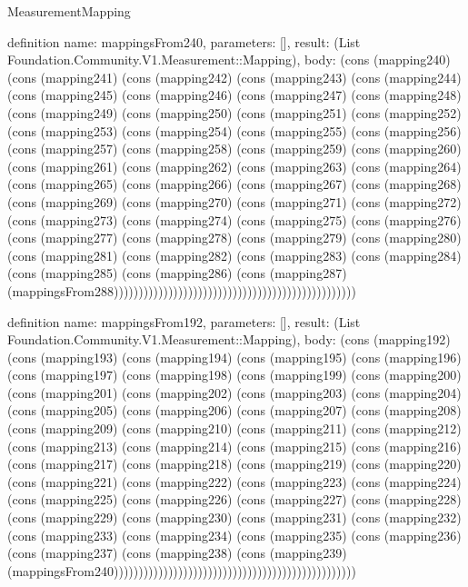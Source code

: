 \begin{lexlean}{MeasurementMapping}
\begin{semanticmodule}
definition{
  name: mappingsFrom240,
  parameters: [],
  result: (List Foundation.Community.V1.Measurement::Mapping),
  body: (cons (mapping240) (cons (mapping241) (cons (mapping242) (cons (mapping243) (cons (mapping244) (cons (mapping245) (cons (mapping246) (cons (mapping247) (cons (mapping248) (cons (mapping249) (cons (mapping250) (cons (mapping251) (cons (mapping252) (cons (mapping253) (cons (mapping254) (cons (mapping255) (cons (mapping256) (cons (mapping257) (cons (mapping258) (cons (mapping259) (cons (mapping260) (cons (mapping261) (cons (mapping262) (cons (mapping263) (cons (mapping264) (cons (mapping265) (cons (mapping266) (cons (mapping267) (cons (mapping268) (cons (mapping269) (cons (mapping270) (cons (mapping271) (cons (mapping272) (cons (mapping273) (cons (mapping274) (cons (mapping275) (cons (mapping276) (cons (mapping277) (cons (mapping278) (cons (mapping279) (cons (mapping280) (cons (mapping281) (cons (mapping282) (cons (mapping283) (cons (mapping284) (cons (mapping285) (cons (mapping286) (cons (mapping287) (mappingsFrom288)))))))))))))))))))))))))))))))))))))))))))))))))
}

definition{
  name: mappingsFrom192,
  parameters: [],
  result: (List Foundation.Community.V1.Measurement::Mapping),
  body: (cons (mapping192) (cons (mapping193) (cons (mapping194) (cons (mapping195) (cons (mapping196) (cons (mapping197) (cons (mapping198) (cons (mapping199) (cons (mapping200) (cons (mapping201) (cons (mapping202) (cons (mapping203) (cons (mapping204) (cons (mapping205) (cons (mapping206) (cons (mapping207) (cons (mapping208) (cons (mapping209) (cons (mapping210) (cons (mapping211) (cons (mapping212) (cons (mapping213) (cons (mapping214) (cons (mapping215) (cons (mapping216) (cons (mapping217) (cons (mapping218) (cons (mapping219) (cons (mapping220) (cons (mapping221) (cons (mapping222) (cons (mapping223) (cons (mapping224) (cons (mapping225) (cons (mapping226) (cons (mapping227) (cons (mapping228) (cons (mapping229) (cons (mapping230) (cons (mapping231) (cons (mapping232) (cons (mapping233) (cons (mapping234) (cons (mapping235) (cons (mapping236) (cons (mapping237) (cons (mapping238) (cons (mapping239) (mappingsFrom240)))))))))))))))))))))))))))))))))))))))))))))))))
}


\end{semanticmodule}
\end{lexlean}
